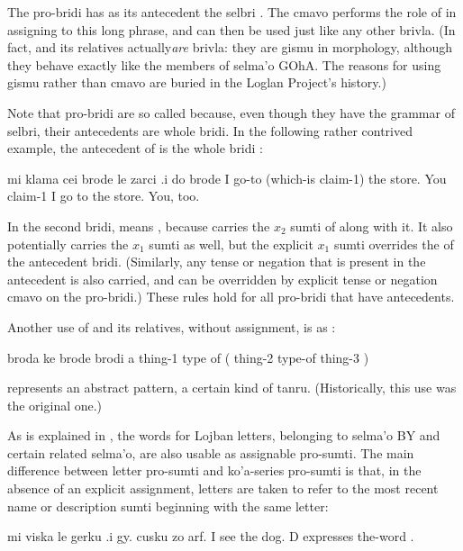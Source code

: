 The pro-bridi  has as its antecedent the selbri
    . The cmavo 
    performs the role of  in assigning  to this
    long phrase, and  can then be used just like any other
    brivla. (In fact,  and its relatives actually\textit{are} brivla: they are gismu in morphology, although they
    behave exactly like the members of selma'o GOhA. The reasons
    for using gismu rather than cmavo are buried in the Loglan
    Project's history.) 

Note that pro-bridi are so called because, even though they
    have the grammar of selbri, their antecedents are whole bridi.
    In the following rather contrived example, the antecedent of
     is the whole bridi :
\begin{example}
mi klama cei brode le zarci .i do brode\n
I go-to (which-is claim-1) the store.  You claim-1\n
I go to the store.  You, too.
\end{example}

In the second bridi,  means ,
    because  carries the $x_2$ sumti of 
    along with it. It also potentially carries the $x_1$ sumti as
    well, but the explicit $x_1$ sumti  overrides the  of
    the antecedent bridi. (Similarly, any tense or negation that is
    present in the antecedent is also carried, and can be
    overridden by explicit tense or negation cmavo on the
    pro-bridi.) These rules hold for all pro-bridi that have
    antecedents. 

Another use of  and its relatives, without
    assignment, is as :
\begin{example}
broda ke brode brodi\n
a thing-1 type of ( thing-2 type-of thing-3 )
\end{example}

{\noindent}represents an abstract pattern, a certain kind of tanru.
    (Historically, this use was the original one.) 

As is explained in , the
    words for Lojban letters, belonging to selma'o BY and certain
    related selma'o, are also usable as assignable pro-sumti. The
    main difference between letter pro-sumti and ko'a-series
    pro-sumti is that, in the absence of an explicit assignment,
    letters are taken to refer to the most recent name or
    description sumti beginning with the same letter:
\begin{example}
mi viska le gerku .i gy. cusku zo arf.\n
I see the dog.  D expresses the-word .
\end{example}

